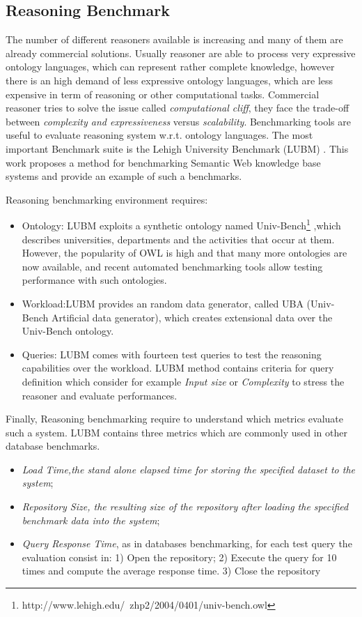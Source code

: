 \subsection{Reasoning Benchmark}\label{sec:lubm}

The number of different reasoners available is increasing and many of them are already commercial solutions. Usually reasoner are able to process very expressive ontology languages, which can represent rather complete knowledge, however there is an high demand of  less expressive ontology languages, which are less expensive in term of reasoning or other computational tasks. Commercial reasoner tries to solve the issue called \textit{computational cliff}, they face the trade-off between \textit{complexity and expressiveness} versus \textit{scalability}. Benchmarking tools are useful to evaluate reasoning system w.r.t. ontology languages.
\cite{bock2008benchmarking} The most important Benchmark suite is the Lehigh University Benchmark  (LUBM) \cite{Guo2005}. This work proposes a  method for benchmarking Semantic Web knowledge base systems and provide an example of such a benchmarks.

Reasoning benchmarking environment requires:
\begin{itemize}
\item Ontology: LUBM exploits a synthetic ontology named Univ-Bench\footnote{http://www.lehigh.edu/~zhp2/2004/0401/univ-bench.owl} ,which describes universities, departments and the activities that occur at them. However, the popularity of OWL is high and that
many more ontologies are now available, and recent automated benchmarking tools allow testing performance with such ontologies\cite{gardiner2006automated}.

\item Workload:LUBM provides an random data generator, called UBA (Univ-Bench Artificial data generator), which creates extensional data over the Univ-Bench ontology. \cite{Guo2005}

\item Queries: LUBM comes with fourteen test queries to test the reasoning capabilities over the workload. LUBM method contains criteria for query definition which consider for example \textit{Input size} or \textit{Complexity} to stress the reasoner and evaluate performances.
\end{itemize}

Finally, Reasoning benchmarking require to understand which metrics evaluate such a system\cite{Guo2005}. LUBM contains three metrics which are commonly used in other database benchmarks.\begin{itemize}
\item \textit{Load Time,the stand alone elapsed time for storing the specified dataset to the system};
\item \textit{Repository Size, the resulting size of the repository after loading the specified benchmark data into the system};
\item \textit{Query Response Time}, as in databases benchmarking, for each test query the evaluation consist in:
  	1) Open the repository; 2) Execute the query for 10 times and compute the average response time. 3) Close the repository
\end{itemize}

